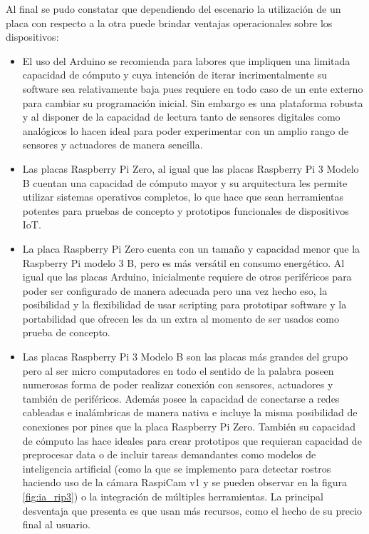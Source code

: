 Al final se pudo constatar que dependiendo del escenario la utilización de un placa con respecto a la otra puede brindar ventajas operacionales sobre los dispositivos:
\begin{itemize}
\item El uso del Arduino se recomienda para labores que impliquen una limitada capacidad de cómputo y cuya intención de iterar incrimentalmente su software sea relativamente baja pues requiere en todo caso de un ente externo para cambiar su programación inicial. Sin embargo es una plataforma robusta y al disponer de la capacidad de lectura tanto de sensores digitales como analógicos lo hacen ideal para poder experimentar con un amplio rango de sensores y actuadores de manera sencilla. 
\item Las placas Raspberry Pi Zero, al igual que las placas Raspberry Pi 3 Modelo B cuentan una capacidad de cómputo mayor y su arquitectura les permite utilizar sistemas operativos completos, lo que hace que sean herramientas potentes para pruebas de concepto y prototipos funcionales de dispositivos IoT.
\item La placa Raspberry Pi Zero cuenta con un tamaño y capacidad menor que la Raspberry Pi modelo 3 B, pero es más versátil en consumo energético. Al igual que las placas Arduino, inicialmente requiere de otros periféricos para poder ser configurado de manera adecuada pero una vez hecho eso, la posibilidad y la flexibilidad de usar scripting para prototipar software y la portabilidad que ofrecen les da un extra al momento de ser usados como prueba de concepto.
\item Las placas Raspberry Pi 3 Modelo B son las placas más grandes del grupo pero al ser micro computadores en todo el sentido de la palabra poseen numerosas forma de poder realizar conexión con sensores, actuadores y también de periféricos. Además posee la capacidad de conectarse a redes cableadas e inalámbricas de manera nativa e incluye la misma posibilidad de conexiones por pines que la placa Raspberry Pi Zero. También su capacidad de cómputo las hace ideales para crear prototipos que requieran capacidad de preprocesar data o de incluir tareas demandantes como modelos de inteligencia artificial (como la que se implemento para detectar rostros haciendo uso de la cámara RaspiCam v1 y se pueden observar en la figura \ref{fig:ia_rip3})  o la integración de múltiples herramientas. La principal desventaja que presenta es que usan más recursos, como el hecho de su precio final al usuario.  
\begin{figure}[htb]

\end{figure}
\end{itemize}
